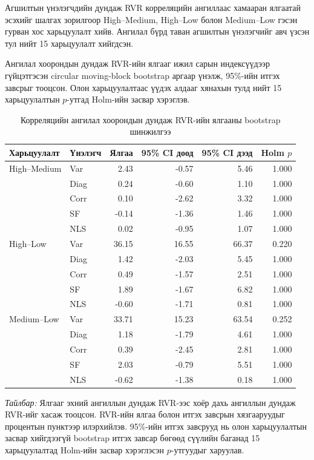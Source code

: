 Агшилтын үнэлэгчдийн дундаж RVR
корреляцийн ангиллаас хамааран ялгаатай
эсэхийг шалгах зорилгоор High--Medium,
High--Low болон Medium--Low гэсэн гурван
хос харьцуулалт хийв. Ангилал бүрд таван
агшилтын үнэлэгчийг авч үзсэн тул нийт
15 харьцуулалт хийгдсэн.

Ангилал хоорондын дундаж RVR-ийн ялгааг
ижил сарын индексүүдээр гүйцэтгэсэн
circular moving-block bootstrap аргаар
үнэлж, 95\%-ийн итгэх завсрыг тооцсон.
Олон харьцуулалтаас үүдэх алдааг
хянахын тулд нийт 15 харьцуулалтын
$p$-утгад Holm-ийн засвар хэрэглэв.

\begin{table}[htbp]
	\centering
	\caption{Корреляцийн ангилал хоорондын
		дундаж RVR-ийн ялгааны bootstrap шинжилгээ}
	\label{tab:tier_comparison}
	\small
	\begin{tabular}{llrrrr}
		\hline
		Харьцуулалт & Үнэлэгч &
		Ялгаа &
		95\% CI доод &
		95\% CI дээд &
		Holm $p$\\
		\hline
		High--Medium
		& Var  &  2.43 & -0.57 &  5.46 & 1.000\\
		& Diag &  0.24 & -0.60 &  1.10 & 1.000\\
		& Corr &  0.10 & -2.62 &  3.32 & 1.000\\
		& SF   & -0.14 & -1.36 &  1.46 & 1.000\\
		& NLS  &  0.02 & -0.95 &  1.07 & 1.000\\
		\hline
		High--Low
		& Var  & 36.15 & 16.55 & 66.37 & 0.220\\
		& Diag &  1.42 & -2.03 &  5.45 & 1.000\\
		& Corr &  0.49 & -1.57 &  2.51 & 1.000\\
		& SF   &  1.89 & -1.67 &  6.82 & 1.000\\
		& NLS  & -0.60 & -1.71 &  0.81 & 1.000\\
		\hline
		Medium--Low
		& Var  & 33.71 & 15.23 & 63.54 & 0.252\\
		& Diag &  1.18 & -1.79 &  4.61 & 1.000\\
		& Corr &  0.39 & -2.45 &  2.81 & 1.000\\
		& SF   &  2.03 & -0.79 &  5.51 & 1.000\\
		& NLS  & -0.62 & -1.38 &  0.18 & 1.000\\
		\hline
	\end{tabular}
\end{table}

\noindent
\textit{Тайлбар:}
Ялгааг эхний ангиллын дундаж RVR-ээс
хоёр дахь ангиллын дундаж RVR-ийг
хасаж тооцсон. RVR-ийн ялгаа болон
итгэх завсрын хязгааруудыг процентын
пунктээр илэрхийлэв.
95\%-ийн итгэх завсрууд нь олон
харьцуулалтын засвар хийгдээгүй
bootstrap итгэх завсар бөгөөд
сүүлийн баганад 15 харьцуулалтад
Holm-ийн засвар хэрэглэсэн
$p$-утгуудыг харуулав.

